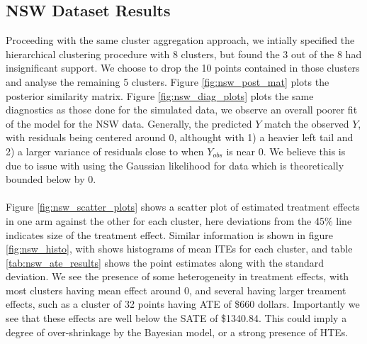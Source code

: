 \documentclass{article}
\begin{document}
\subsection{NSW Dataset Results} 
Proceeding with the same cluster aggregation approach, we intially specified the hierarchical clustering procedure with 8 clusters, but found the 3 out of the 8 had insignificant support. We choose to drop the 10 points contained in those clusters and analyse the remaining 5 clusters.  Figure \ref{fig:nsw_post_mat} plots the posterior similarity matrix. Figure \ref{fig:nsw_diag_plots} plots the same diagnostics as those done for the simulated data, we observe an overall poorer fit of the model for the NSW data. Generally, the predicted $Y$ match the observed $Y$, with residuals being centered around 0, althought with 1) a heavier left tail and 2) a larger variance of residuals close to when $Y_{obs}$ is near 0. We believe this is due to issue with using the Gaussian likelihood for data which is theoretically bounded below by 0.
\\ \\
Figure \ref{fig:nsw_scatter_plots} shows a scatter plot of estimated treatment effects in one arm against the other for each cluster, here deviations from the 45\% line indicates size of the treatment effect. Similar information is shown in figure \ref{fig:nsw_histo}, with shows histograms of mean ITEs for each cluster, and table \ref{tab:nsw_ate_results} shows the point estimates along with the standard deviation. We see the presence of some heterogeneity in treatment effects, with most clusters having mean effect around 0, and several having larger treament effects, such as a cluster of 32 points having ATE of \$660 dollars. Importantly we see that these effects are well below the SATE of \$1340.84. This could imply a degree of over-shrinkage by the Bayesian model, or a strong presence of HTEs. 
\\ \\
\end{document}
